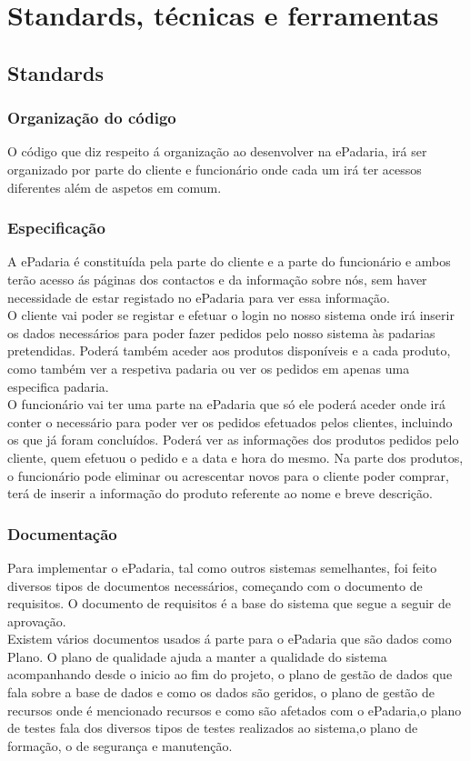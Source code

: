 \chapter{Standards, técnicas e ferramentas}
\label{standards_tecnicas_ferramentas}

\section{Standards}
\subsection{Organização do código}
O código que diz respeito á organização ao desenvolver na ePadaria, irá ser organizado por parte do cliente e funcionário onde cada um irá ter acessos diferentes além de aspetos em comum.
\subsection{Especificação}
A ePadaria é constituída pela parte do cliente e a parte do funcionário e ambos terão acesso ás páginas dos contactos e da informação sobre nós, sem haver necessidade de estar registado no ePadaria para ver essa informação.\\
O cliente vai poder se registar e efetuar o login no nosso sistema onde irá inserir os dados necessários para poder fazer pedidos pelo nosso sistema às  padarias pretendidas. Poderá também aceder aos produtos disponíveis e a cada produto, como também ver a respetiva padaria ou ver os pedidos em apenas uma especifica padaria. \\
O funcionário vai ter uma parte na ePadaria que só ele poderá aceder onde irá conter o necessário para poder ver os pedidos efetuados pelos clientes, incluindo os que já foram concluídos. Poderá ver as informações dos produtos pedidos pelo cliente, quem efetuou o pedido e a data e hora do mesmo. Na parte dos produtos, o funcionário pode eliminar ou acrescentar novos para o cliente poder comprar, terá de inserir a informação do produto referente ao nome e breve descrição.

\subsection{Documentação}
Para implementar o ePadaria, tal como outros sistemas semelhantes, foi feito diversos tipos de documentos necessários, começando com o documento de requisitos. O documento de requisitos é a base do sistema que segue a seguir de aprovação.\\
Existem vários documentos usados á parte para o ePadaria que são dados como Plano. O plano de qualidade ajuda a manter a qualidade do sistema acompanhando desde o inicio ao fim do projeto, o plano de gestão de dados que fala sobre a base de dados e como os dados são geridos, o plano de gestão de recursos onde é mencionado recursos e como são afetados com o ePadaria,o plano de testes fala dos diversos tipos de testes realizados ao sistema,o plano de formação, o de segurança e manutenção.


